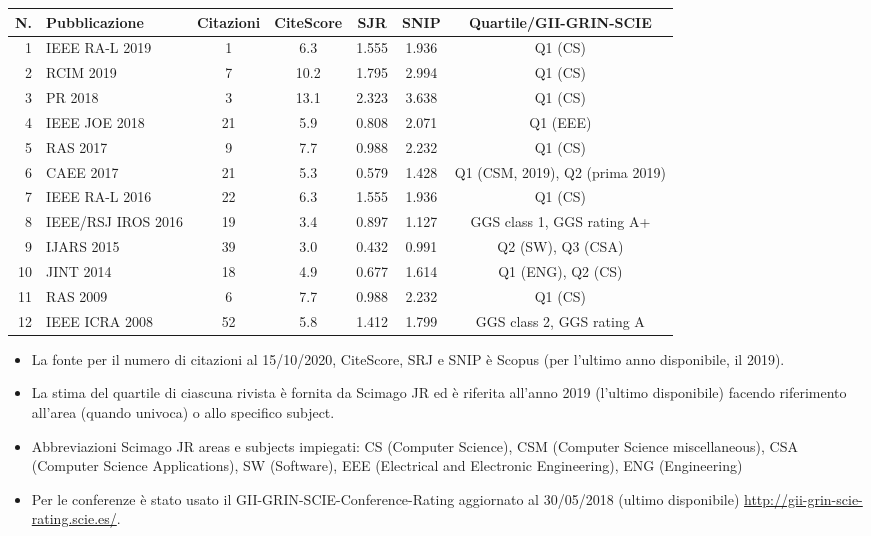 \documentclass[11pt]{article}
\begin{document}
{\footnotesize
\begin{table}[!ht]
  \begin{tabular}{|r|l|c|c|c|c|c|}
  \hline
  N. & Pubblicazione                             & Citazioni & CiteScore & SJR   & SNIP & Quartile/GII-GRIN-SCIE \\
  \hline
    1 &\cite{lodirizzini2019ral} IEEE RA-L 2019  &   1       &  6.3      & 1.555 & 1.936 & Q1 (CS) \\
    2 &\cite{galasso2019rcim} RCIM 2019          &   7       & 10.2      & 1.795 & 2.994 & Q1 (CS) \\
    3 &\cite{lodirizzini2018pr} PR 2018          &   3       & 13.1      & 2.323 & 3.638 & Q1 (CS) \\
    4 &\cite{simetti2018joe} IEEE JOE 2018       &  21       &  5.9      & 0.808 & 2.071 & Q1 (EEE) \\
    5 &\cite{kallasi2017ras} RAS 2017            &   9       &  7.7      & 0.988 & 2.232 & Q1 (CS) \\
    6 &\cite{lodirizzini2017caee} CAEE 2017      &  21       &  5.3      & 0.579 & 1.428 & Q1 (CSM, 2019), Q2 (prima 2019) \\
    7 &\cite{kallasi2016ral} IEEE RA-L 2016      &  22       &  6.3      & 1.555 & 1.936 & Q1 (CS) \\
    8 &\cite{kallasi2016iros} IEEE/RSJ IROS 2016 &  19       &  3.4      & 0.897 & 1.127 & GGS class 1, GGS rating A+ \\
    9 &\cite{lodirizzini2015ijars} IJARS 2015    &  39       &  3.0      & 0.432 & 0.991 & Q2 (SW), Q3 (CSA) \\
   10 &\cite{aleotti2014jirs} JINT 2014          &  18       &  4.9      & 0.677 & 1.614 & Q1 (ENG), Q2 (CS) \\
   11 &\cite{lodirizzini2009ras} RAS 2009        &   6       &  7.7      & 0.988 & 2.232 & Q1 (CS) \\
   12 &\cite{grisetti2008icra} IEEE ICRA 2008    &  52       &  5.8      & 1.412 & 1.799 & GGS class 2, GGS rating A \\
  \hline
  \end{tabular}
\end{table}
}

\begin{itemize}
\item La fonte per il numero di citazioni al 15/10/2020, CiteScore, SRJ e SNIP \`e Scopus (per l'ultimo anno disponibile, il 2019). 
\item La stima del quartile di ciascuna rivista \`e fornita da Scimago JR ed \`e riferita all'anno 2019 (l'ultimo disponibile) facendo riferimento all'area (quando univoca) o allo specifico subject.
\item Abbreviazioni Scimago JR areas e subjects impiegati: 
   CS (Computer Science), 
   CSM (Computer Science miscellaneous), 
   CSA (Computer Science Applications), 
   SW (Software), 
   EEE (Electrical and Electronic Engineering), 
   ENG (Engineering)
\item Per le conferenze \`e stato usato il GII-GRIN-SCIE-Conference-Rating aggiornato al 30/05/2018 (ultimo disponibile) \url{http://gii-grin-scie-rating.scie.es/}.
\end{itemize}
\end{document}
